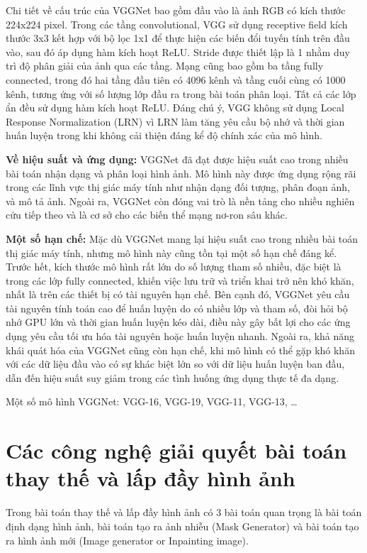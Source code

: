 \documentclass[12pt]{report}
\begin{document}
Chi tiết về cấu trúc của VGGNet bao gồm đầu vào là ảnh RGB có kích thước 224x224 pixel. Trong các tầng convolutional, VGG sử dụng receptive field kích thước 3x3 kết hợp với bộ lọc 1x1 để thực hiện các biến đổi tuyến tính trên đầu vào, sau đó áp dụng hàm kích hoạt ReLU. Stride được thiết lập là 1 nhằm duy trì độ phân giải của ảnh qua các tầng. Mạng cũng bao gồm ba tầng fully connected, trong đó hai tầng đầu tiên có 4096 kênh và tầng cuối cùng có 1000 kênh, tương ứng với số lượng lớp đầu ra trong bài toán phân loại. Tất cả các lớp ẩn đều sử dụng hàm kích hoạt ReLU. Đáng chú ý, VGG không sử dụng Local Response Normalization (LRN) vì LRN làm tăng yêu cầu bộ nhớ và thời gian huấn luyện trong khi không cải thiện đáng kể độ chính xác của mô hình.

\textbf{Về hiệu suất và ứng dụng:} VGGNet đã đạt được hiệu suất cao trong nhiều bài toán nhận dạng và phân loại hình ảnh. Mô hình này được ứng dụng rộng rãi trong các lĩnh vực thị giác máy tính như nhận dạng đối tượng, phân đoạn ảnh, và mô tả ảnh. Ngoài ra, VGGNet còn đóng vai trò là nền tảng cho nhiều nghiên cứu tiếp theo và là cơ sở cho các biến thể mạng nơ-ron sâu khác.


\textbf{Một số hạn chế:} Mặc dù VGGNet mang lại hiệu suất cao trong nhiều bài toán thị giác máy tính, nhưng mô hình này cũng tồn tại một số hạn chế đáng kể. Trước hết, kích thước mô hình rất lớn do số lượng tham số nhiều, đặc biệt là trong các lớp fully connected, khiến việc lưu trữ và triển khai trở nên khó khăn, nhất là trên các thiết bị có tài nguyên hạn chế. Bên cạnh đó, VGGNet yêu cầu tài nguyên tính toán cao để huấn luyện do có nhiều lớp và tham số, đòi hỏi bộ nhớ GPU lớn và thời gian huấn luyện kéo dài, điều này gây bất lợi cho các ứng dụng yêu cầu tối ưu hóa tài nguyên hoặc huấn luyện nhanh. Ngoài ra, khả năng khái quát hóa của VGGNet cũng còn hạn chế, khi mô hình có thể gặp khó khăn với các dữ liệu đầu vào có sự khác biệt lớn so với dữ liệu huấn luyện ban đầu, dẫn đến hiệu suất suy giảm trong các tình huống ứng dụng thực tế đa dạng.


Một số mô hình VGGNet: VGG-16, VGG-19, VGG-11, VGG-13, …
\section{Các công nghệ giải quyết bài toán thay thế và lấp đầy hình ảnh}

Trong bài toán thay thế và lấp đầy hình ảnh có 3 bài toán quan trọng là bài toán định dạng hình ảnh, bài toán tạo ra ảnh nhiễu (Mask Generator) và bài toán tạo ra hình ảnh mới (Image generator or Inpainting image).
\end{document}
